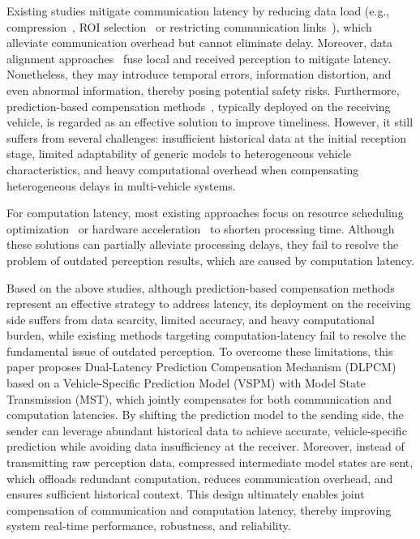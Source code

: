 Existing studies mitigate communication latency by reducing data load (e.g., compression~\cite{xu2022opv2v,wang2023vimi,zheng2024real}, ROI selection~\cite{yuan2022keypoints,lohdefink2020focussing,hu2022where2comm} or restricting communication links~\cite{liu2020who2com,qu2024model}), which alleviate communication overhead but cannot eliminate delay. Moreover, data alignment approaches~\cite{liu2024select2col,liu2024v2x,lin2024v2vformer,lei2024robust,bai2023vinet} fuse local and received perception to mitigate latency. Nonetheless, they may introduce temporal errors, information distortion, and even abnormal information, thereby posing potential safety risks. Furthermore, prediction-based compensation methods~\cite{wang2025cmp,rossle2024unlocking,fang2024pacp,yu2023vehicle,lei2022latency}, typically deployed on the receiving vehicle, is regarded as an effective solution to improve timeliness. However, it still suffers from several challenges: insufficient historical data at the initial reception stage, limited adaptability of generic models to heterogeneous vehicle characteristics, and heavy computational overhead when compensating heterogeneous delays in multi-vehicle systems. 

For computation latency, most existing approaches focus on resource scheduling optimization~\cite{xu2024intelligent,lu2025joint} or hardware acceleration~\cite{fan2023hardware} to shorten processing time. Although these solutions can partially alleviate processing delays, they fail to resolve the problem of outdated perception results, which are caused by computation latency. 

Based on the above studies, although prediction-based compensation methods represent an effective strategy to address latency, its deployment on the receiving side suffers from data scarcity, limited accuracy, and heavy computational burden, while existing methods targeting
computation-latency fail to resolve the fundamental issue of outdated perception. To overcome these limitations, this paper proposes Dual-Latency Prediction Compensation Mechanism (DLPCM) based on a Vehicle-Specific Prediction Model (VSPM) with Model State Transmission (MST), which jointly compensates for both communication and computation latencies. By shifting the prediction model to the sending side, the sender can leverage abundant historical data to achieve accurate, vehicle-specific prediction while avoiding data insufficiency at the receiver. Moreover, instead of transmitting raw perception data, compressed intermediate model states are sent, which offloads redundant computation, reduces communication overhead, and ensures sufficient historical context. This design ultimately enables joint compensation of communication and computation latency, thereby improving system real-time performance, robustness, and reliability.

